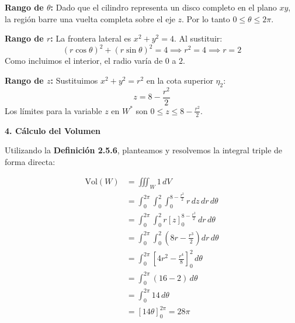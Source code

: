 \textbf{Rango de $\theta$:} Dado que el cilindro representa un disco completo en el plano $xy$, la región barre una vuelta completa sobre el eje $z$. Por lo tanto $0 \leq \theta \leq 2\pi$.

\textbf{Rango de $r$:} La frontera lateral es $x^2 + y^2 = 4$. Al sustituir:
\[
    (r \cos \theta)^2 + (r \sin \theta)^2 = 4 \implies r^2 = 4 \implies r = 2
\]
Como incluimos el interior, el radio varía de $0$ a $2$.

\textbf{Rango de $z$:} Sustituimos $x^2 + y^2 = r^2$ en la cota superior $\eta_2$:
\[
    z = 8 - \frac{r^2}{2}
\]
Los límites para la variable $z$ en $W^*$ son $0 \leq z \leq 8 - \frac{r^2}{2}$.

\vspace{0.3cm}
\textbf{4. Cálculo del Volumen}

Utilizando la \textbf{Definición 2.5.6}, planteamos y resolvemos la integral triple de forma directa:

\begin{align*}
    \text{Vol}(W) &= \iiint_W 1 \, dV \\
    &= \int_{0}^{2\pi} \int_{0}^{2} \int_{0}^{8 - \frac{r^2}{2}} r \, dz \, dr \, d\theta \\
    &= \int_{0}^{2\pi} \int_{0}^{2} r \left[ z \right]_{0}^{8 - \frac{r^2}{2}} \, dr \, d\theta \\
    &= \int_{0}^{2\pi} \int_{0}^{2} \left( 8r - \frac{r^3}{2} \right) dr \, d\theta \\
    &= \int_{0}^{2\pi} \left[ 4r^2 - \frac{r^4}{8} \right]_{0}^{2} \, d\theta \\
    &= \int_{0}^{2\pi} (16 - 2) \, d\theta \\
    &= \int_{0}^{2\pi} 14 \, d\theta \\
    &= \left[ 14\theta \right]_{0}^{2\pi} = 28\pi
\end{align*}